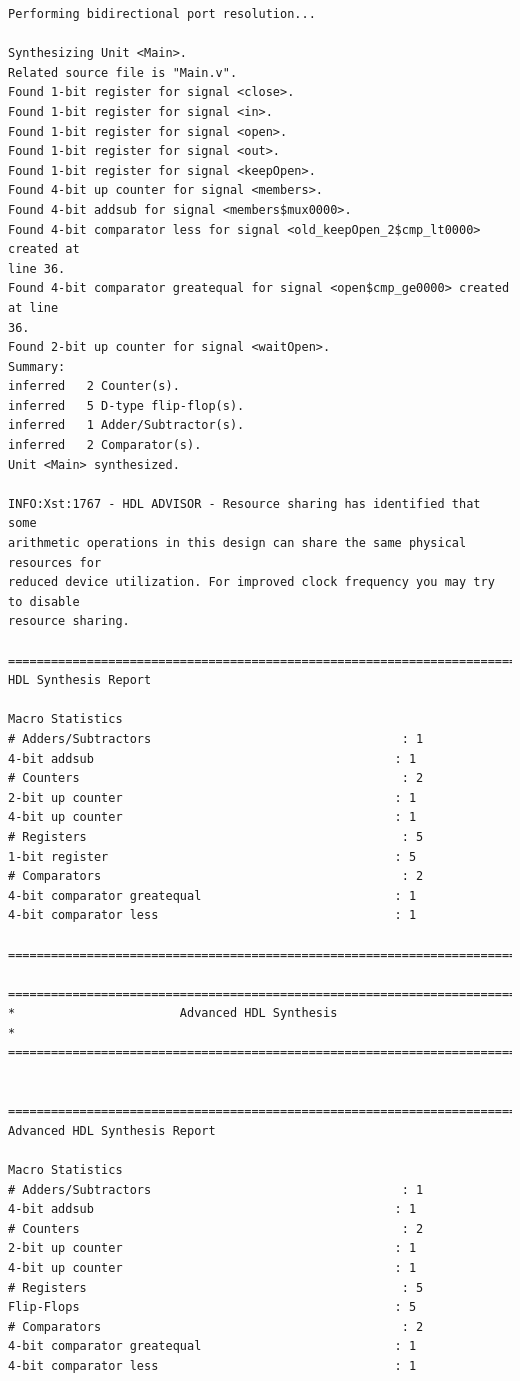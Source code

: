 \documentclass[fleqn]{article}
\begin{document}
\begin{latin}
\begin{lstlisting}[basicstyle=\tiny]
Performing bidirectional port resolution...

Synthesizing Unit <Main>.
Related source file is "Main.v".
Found 1-bit register for signal <close>.
Found 1-bit register for signal <in>.
Found 1-bit register for signal <open>.
Found 1-bit register for signal <out>.
Found 1-bit register for signal <keepOpen>.
Found 4-bit up counter for signal <members>.
Found 4-bit addsub for signal <members$mux0000>.
Found 4-bit comparator less for signal <old_keepOpen_2$cmp_lt0000> created at 
line 36.
Found 4-bit comparator greatequal for signal <open$cmp_ge0000> created at line 
36.
Found 2-bit up counter for signal <waitOpen>.
Summary:
inferred   2 Counter(s).
inferred   5 D-type flip-flop(s).
inferred   1 Adder/Subtractor(s).
inferred   2 Comparator(s).
Unit <Main> synthesized.

INFO:Xst:1767 - HDL ADVISOR - Resource sharing has identified that some 
arithmetic operations in this design can share the same physical resources for 
reduced device utilization. For improved clock frequency you may try to disable 
resource sharing.

=========================================================================
HDL Synthesis Report

Macro Statistics
# Adders/Subtractors                                   : 1
4-bit addsub                                          : 1
# Counters                                             : 2
2-bit up counter                                      : 1
4-bit up counter                                      : 1
# Registers                                            : 5
1-bit register                                        : 5
# Comparators                                          : 2
4-bit comparator greatequal                           : 1
4-bit comparator less                                 : 1

=========================================================================

=========================================================================
*                       Advanced HDL Synthesis                          *
=========================================================================


=========================================================================
Advanced HDL Synthesis Report

Macro Statistics
# Adders/Subtractors                                   : 1
4-bit addsub                                          : 1
# Counters                                             : 2
2-bit up counter                                      : 1
4-bit up counter                                      : 1
# Registers                                            : 5
Flip-Flops                                            : 5
# Comparators                                          : 2
4-bit comparator greatequal                           : 1
4-bit comparator less                                 : 1


\end{lstlisting}
\end{latin}
\end{document}
